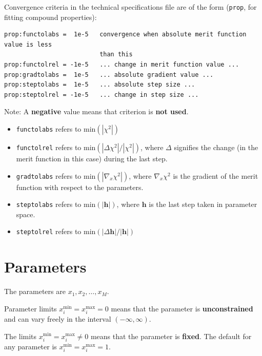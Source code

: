 \documentclass[a4paper,12pt,pdftex,onecolumn]{article}
\begin{document}
Convergence criteria in the technical specifications file are of the form
(\verb+prop+, for fitting compound properties):

\begin{Verbatim}[fontsize=\relsize{-1},frame=single]
prop:functolabs =  1e-5   convergence when absolute merit function value is less
                          than this
prop:functolrel = -1e-5   ... change in merit function value ...
prop:gradtolabs =  1e-5   ... absolute gradient value ...
prop:steptolabs =  1e-5   ... absolute step size ...
prop:steptolrel = -1e-5   ... change in step size ...
\end{Verbatim}

Note: A \textbf{negative} value means that criterion is \textbf{not used}.

\begin{itemize}
\item
\verb+functolabs+ refers to $\mathrm{min}(|\chi^2|)$

\item
\verb+functolrel+ refers to $\mathrm{min}(|\Delta \chi^2|/|\chi^2|)$, where
$\Delta$ signifies the change (in the merit function in this case) during the
last step.

\item
\verb+gradtolabs+ refers to $\mathrm{min}(|\nabla_x \chi^2|)$, where $\nabla_x \chi^2$
is the gradient of the merit function with respect to the parameters.

\item
\verb+steptolabs+ refers to $\mathrm{min}(|\mathbf{h}|)$, where $\mathbf{h}$ is
the last step taken in parameter space.

\item
\verb+steptolrel+ refers to $\mathrm{min}(|\Delta \mathbf{h}|/|\mathbf{h}|)$
\end{itemize}








\section{Parameters}

The parameters are $x_1, x_2, \ldots, x_M$.

Parameter limits $x_i^{\mathrm{min}} = x_i^{\mathrm{max}} = 0$
means that the parameter is
\textbf{unconstrained} and can vary freely in the interval $(-\infty, \infty)$.

The limits $x_i^{\mathrm{min}} = x_i^{\mathrm{max}} \neq 0$
means that the parameter is \textbf{fixed}.
The default for any parameter is $x_i^{\mathrm{min}} = x_i^{\mathrm{max}} = 1$.
\end{document}
